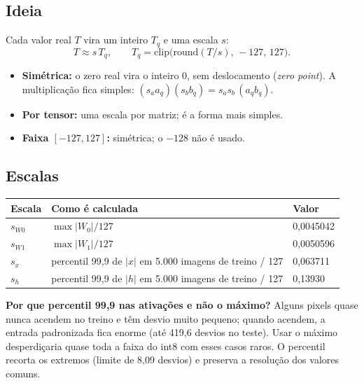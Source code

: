 \documentclass[10pt]{article}
\begin{document}
\subsection{Ideia}
Cada valor real $T$ vira um inteiro $T_q$ e uma escala $s$:
\[
T \approx s\,T_q,\qquad T_q = \mathrm{clip}\big(\mathrm{round}(T/s),\,-127,\,127\big).
\]
\begin{itemize}
\item \textbf{Simétrica:} o zero real vira o inteiro 0, sem deslocamento (\emph{zero point}). A
      multiplicação fica simples: $(s_a a_q)(s_b b_q) = s_a s_b\,(a_q b_q)$.
\item \textbf{Por tensor:} uma escala por matriz; é a forma mais simples.
\item \textbf{Faixa $[-127,127]$:} simétrica; o $-128$ não é usado.
\end{itemize}

\subsection{Escalas}
\begin{center}\footnotesize
\begin{tabularx}{\linewidth}{@{}l L l@{}}
\toprule
Escala & Como é calculada & Valor \\
\midrule
$s_{W0}$ & $\max|W_0|/127$ & 0,0045042 \\
$s_{W1}$ & $\max|W_1|/127$ & 0,0050596 \\
$s_x$ & percentil 99,9 de $|x|$ em 5.000 imagens de treino / 127 & 0,063711 \\
$s_h$ & percentil 99,9 de $|h|$ em 5.000 imagens de treino / 127 & 0,13930 \\
\bottomrule
\end{tabularx}
\end{center}

\textbf{Por que percentil 99,9 nas ativações e não o máximo?} Alguns pixels quase nunca acendem no
treino e têm desvio muito pequeno; quando acendem, a entrada padronizada fica enorme (até 419,6
desvios no teste). Usar o máximo desperdiçaria quase toda a faixa do int8 com esses casos raros.
O percentil recorta os extremos (limite de 8,09 desvios) e preserva a resolução dos valores comuns.
\end{document}
